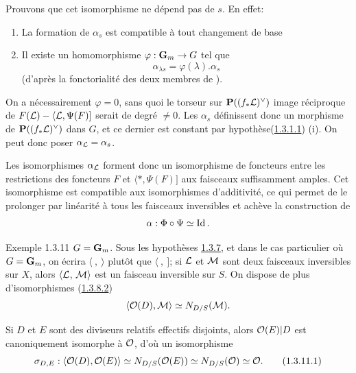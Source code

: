 \documentclass[10pt]{../fichiers-configuration-latex/smfart}
\begin{document}
Prouvons que cet isomorphisme ne dépend pas de $s$. En effet:
\begin{enumerate}
\renewcommand{\theenumi}{\roman{enumi}}
\renewcommand{\labelenumi}{(\theenumi)}
\item La formation de $\alpha_{s}$ est compatible à tout changement de
base

\item Il existe un homomorphisme $\varphi:\mathbf{G}_{m}\rightarrow G$ tel que
$$
\alpha_{\lambda s}=\varphi(\lambda).\alpha_{s}
$$
(d'après la fonctorialité des deux membres de ).
\end{enumerate}

On a nécessairement $\varphi=0$, sans quoi le torseur sur
$\mathbf{P}((f_{\ast}{\mathcal L})^{\vee})$ image réciproque de
$F({\mathcal L})-\langle {\mathcal L},\Psi(F)]$ serait de degré $\neq 0$. Les
$\alpha_{s}$ définissent donc un morphisme de
$\mathbf{P}((f_{\ast}{\mathcal L})^{\vee})$ dans $G$, et ce dernier est
constant par hypothèse\pageoriginale (\hyperref[XVIII.par1.3.1.1]{1.3.1.1}) (i). 
On peut donc poser $\alpha_{{\mathcal L}}=\alpha_{s}$.

Les isomorphismes $\alpha_{{\mathcal L}}$ forment donc un isomorphisme
de foncteurs entre les restrictions des foncteurs $F$ et $\langle *,\Psi(F)]$
aux faisceaux suffisamment amples. Cet isomorphisme est compatible aux
isomorphismes d'additivité, ce qui permet de le prolonger par
linéarité à tous les faisceaux inversibles et achève la construction
de
$$
\alpha:\Phi\circ\Psi\simeq \operatorname{Id}{}.
$$

\begin{enonce*}[remark]{Exemple 1.3.11}
$G=\mathbf{G}_{m}$. Sous les hypothèses \hyperref[XVIII.subsubsec1.3.7]{1.3.7}, et dans le cas
particulier où $G=\mathbf{G}_{m}$, on écrira $\langle~,~\rangle $ plutôt que
$\langle~,~]$; si ${\mathcal L}$ et ${\mathcal M}$ sont deux faisceaux inversibles
sur $X$, alors $\langle {\mathcal L}$, ${\mathcal M}\rangle $ est un faisceau
inversible sur $S$. On dispose de plus d'isomorphismes (\hyperref[XVIII.par1.3.8.2]{1.3.8.2})
$$
\langle {\mathcal O}(D),{\mathcal M}\rangle \simeq N_{D/S}({\mathcal M}){}.
$$

Si $D$ et $E$ sont des diviseurs relatifs  effectifs disjoints, alors
${\mathcal O}(E)|D$ est canoniquement isomorphe à ${\mathcal O}$, d'où un isomorphisme
\begin{equation}
\sigma_{D,E}:\langle {\mathcal O}(D),{\mathcal O}(E)\rangle \simeq N_{D/S}({\mathcal O}(E))\simeq
N_{D/S}({\mathcal O})\simeq {\mathcal O}{}.\tag{1.3.11.1}
\end{equation}
\end{enonce*}
\end{document}
